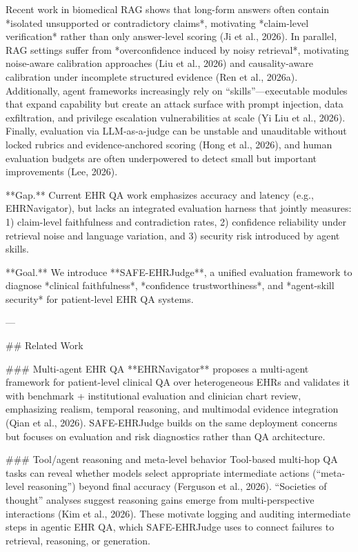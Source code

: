 Recent work in biomedical RAG shows that long-form answers often contain *isolated unsupported or contradictory claims*, motivating *claim-level verification* rather than only answer-level scoring (Ji et al., 2026). In parallel, RAG settings suffer from *overconfidence induced by noisy retrieval*, motivating noise-aware calibration approaches (Liu et al., 2026) and causality-aware calibration under incomplete structured evidence (Ren et al., 2026a). Additionally, agent frameworks increasingly rely on “skills”—executable modules that expand capability but create an attack surface with prompt injection, data exfiltration, and privilege escalation vulnerabilities at scale (Yi Liu et al., 2026). Finally, evaluation via LLM-as-a-judge can be unstable and unauditable without locked rubrics and evidence-anchored scoring (Hong et al., 2026), and human evaluation budgets are often underpowered to detect small but important improvements (Lee, 2026).

**Gap.** Current EHR QA work emphasizes accuracy and latency (e.g., EHRNavigator), but lacks an integrated evaluation harness that jointly measures:  
1) claim-level faithfulness and contradiction rates,  
2) confidence reliability under retrieval noise and language variation, and  
3) security risk introduced by agent skills.

**Goal.** We introduce **SAFE-EHRJudge**, a unified evaluation framework to diagnose *clinical faithfulness*, *confidence trustworthiness*, and *agent-skill security* for patient-level EHR QA systems.

---

## Related Work  

### Multi-agent EHR QA  
**EHRNavigator** proposes a multi-agent framework for patient-level clinical QA over heterogeneous EHRs and validates it with benchmark + institutional evaluation and clinician chart review, emphasizing realism, temporal reasoning, and multimodal evidence integration (Qian et al., 2026). SAFE-EHRJudge builds on the same deployment concerns but focuses on evaluation and risk diagnostics rather than QA architecture.

### Tool/agent reasoning and meta-level behavior  
Tool-based multi-hop QA tasks can reveal whether models select appropriate intermediate actions (“meta-level reasoning”) beyond final accuracy (Ferguson et al., 2026). “Societies of thought” analyses suggest reasoning gains emerge from multi-perspective interactions (Kim et al., 2026). These motivate logging and auditing intermediate steps in agentic EHR QA, which SAFE-EHRJudge uses to connect failures to retrieval, reasoning, or generation.

